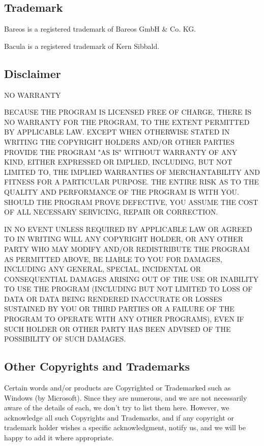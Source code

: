 \subsection*{Trademark}

Bareos\raisebox{.6ex}{\textsuperscript{\textregistered}} is a registered
trademark of Bareos GmbH \& Co. KG.

Bacula\raisebox{.6ex}{\textsuperscript{\textregistered}} is a registered
trademark of Kern Sibbald.

\subsection*{Disclaimer}

NO WARRANTY

BECAUSE THE PROGRAM IS LICENSED FREE OF CHARGE, THERE IS NO WARRANTY FOR THE
PROGRAM, TO THE EXTENT PERMITTED BY APPLICABLE LAW. EXCEPT WHEN OTHERWISE
STATED IN WRITING THE COPYRIGHT HOLDERS AND/OR OTHER PARTIES PROVIDE THE
PROGRAM "AS IS" WITHOUT WARRANTY OF ANY KIND, EITHER EXPRESSED OR IMPLIED,
INCLUDING, BUT NOT LIMITED TO, THE IMPLIED WARRANTIES OF MERCHANTABILITY AND
FITNESS FOR A PARTICULAR PURPOSE. THE ENTIRE RISK AS TO THE QUALITY AND
PERFORMANCE OF THE PROGRAM IS WITH YOU. SHOULD THE PROGRAM PROVE DEFECTIVE,
YOU ASSUME THE COST OF ALL NECESSARY SERVICING, REPAIR OR CORRECTION.

IN NO EVENT UNLESS REQUIRED BY APPLICABLE LAW OR AGREED TO IN WRITING WILL ANY
COPYRIGHT HOLDER, OR ANY OTHER PARTY WHO MAY MODIFY AND/OR REDISTRIBUTE THE
PROGRAM AS PERMITTED ABOVE, BE LIABLE TO YOU FOR DAMAGES, INCLUDING ANY
GENERAL, SPECIAL, INCIDENTAL OR CONSEQUENTIAL DAMAGES ARISING OUT OF THE USE
OR INABILITY TO USE THE PROGRAM (INCLUDING BUT NOT LIMITED TO LOSS OF DATA OR
DATA BEING RENDERED INACCURATE OR LOSSES SUSTAINED BY YOU OR THIRD PARTIES OR
A FAILURE OF THE PROGRAM TO OPERATE WITH ANY OTHER PROGRAMS), EVEN IF SUCH
HOLDER OR OTHER PARTY HAS BEEN ADVISED OF THE POSSIBILITY OF SUCH DAMAGES.

\subsection*{Other Copyrights and Trademarks}

Certain words and/or products are Copyrighted or Trademarked such as Windows (by Microsoft). Since
they are numerous, and we are not necessarily aware of the details of each, we don’t try to list them here.
However, we acknowledge all such Copyrights and Trademarks, and if any copyright or trademark holder
wishes a specific acknowledgment, notify us, and we will be happy to add it where appropriate.
